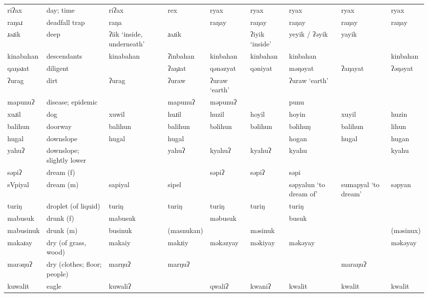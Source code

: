 \begin{landscape}
\begin{longtable}{*{9}{>{\raggedright\arraybackslash}p{}}}
\text{*}riʔax        & day; time & riʔax & rex & ryax & ryax & ryax & ryax & ryax\\
\text{*}raŋaɹ        & deadfall trap & raŋa &  & raŋay & raŋay & raŋay & raŋay & raŋay\\
\text{*}ɹəɹik        & deep & ʔiik `inside, underneath' & ɹaɹik &  & ʔiyik `inside' & yeyik / ʔəyik & yayik & \\
\text{*}kinabahan    & descendants & kinabahan & ʔinbahan & kinbahan & kinbahan & kinbahan &  & kinbahan\\
\text{*}qaŋəɹat      & diligent &  & ʔaŋɹat & qənəzyat & qəniyat & məŋəyat & ʔaŋayat & ʔəŋəyat\\
\text{*}ʔurag        & dirt & ʔurag & ʔuraw & ʔuraw `earth' &  & ʔuraw `earth' &  & \\
\text{*}mapunuʔ      & disease; epidemic &  & mapunuʔ & məpunuʔ &  & punu &  & \\
\text{*}xuɹil        & dog & xuwil & huɹil & huzil & hoyil & hoyin & xuyil & huzin\\
\text{*}balihun      & doorway & balihun & balihun & bəlihun & bəlihun & bəlihuŋ & balihun & lihun\\
\text{*}hugal        & downslope & hugal & hugal &  &  & hogan & hugal & hugan\\
\text{*}yahuʔ        & downslope; slightly lower &  & yahuʔ & kyahuʔ & kyahuʔ & kyahu &  & kyahu\\
\text{*}səpiʔ        & dream (f) &  &  & səpiʔ & səpiʔ & səpi &  & \\
\text{*}sVpiyal      & dream (m) & sapiyal & sipel &  &  & səpyalun \newline `to dream of' & sumapyal \newline `to dream' & səpyan\\
\text{*}turiŋ        & droplet (of liquid) & turiŋ & turiŋ & turiŋ & turiŋ & turiŋ &  & \\
\text{*}mabusuk      & drunk (f) & mabusuk &  & məbusuk &  & busuk &  & \\
\text{*}mabusinuk    & drunk (m) & businuk & (masnukan) &  & məsinuk &  &  & (məsinux)\\
\text{*}makəɹay      & dry (of grass, wood) & makaiy & makɹiy & məkəzyay & məkiyay & məkəyay &  & məkəyay\\
\text{*}marəŋuʔ      & dry (clothes; floor; people) & marŋuʔ & marŋuʔ &  &  &  & maraŋuʔ & \\
\text{*}kuwalit      & eagle & kuwaliʔ &  & qwaliʔ & kwaniʔ & kwalit & kwalit & kwalit\\

\end{longtable}
\end{landscape}
